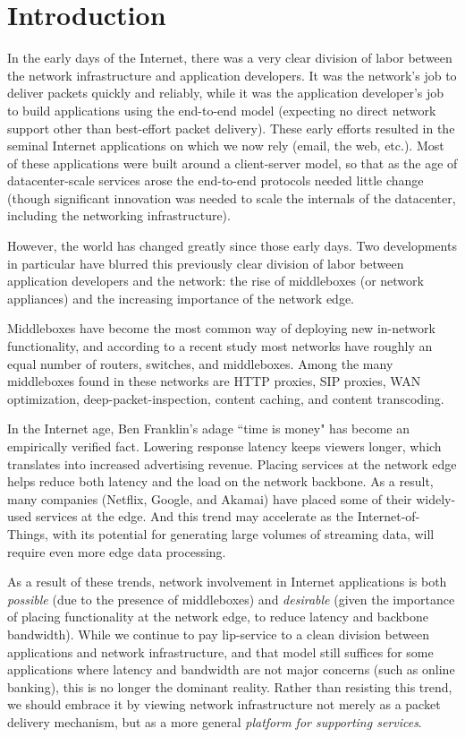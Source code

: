 \section{Introduction}
\label{sec:intro}

In the early days of the Internet, there was a very clear division of labor between the network infrastructure and application developers. It was the network's job to deliver packets quickly and reliably, while it was the application developer's job to build applications using the end-to-end model (\ie expecting no direct network support other than best-effort packet delivery). These early efforts resulted in the seminal Internet applications on which we now rely (email, the web, etc.).  Most of these applications were built around a client-server model, so that as the age of datacenter-scale services arose the end-to-end protocols needed little change (though significant innovation was needed to scale the internals of the datacenter, including the networking infrastructure). 

However, the world has changed greatly since those early days. Two developments in particular have blurred this previously clear division of labor between application developers and the network: the rise of middleboxes (or network appliances) and the increasing importance of the network edge. 

Middleboxes have become the most common way of deploying new in-network functionality, and according to a recent study\cite{sylviamidbox} most networks have roughly an equal number of routers, switches, and middleboxes. Among the many middleboxes found in these networks are HTTP proxies, SIP proxies, WAN optimization, deep-packet-inspection, content caching, and content transcoding. 

In the Internet age, Ben Franklin's adage ``time is money" has become an empirically verified fact. Lowering response latency keeps viewers longer, which translates into increased advertising revenue. Placing services at the network edge helps reduce both latency and the load on the network backbone. As a result, many companies (\eg Netflix, Google, and Akamai) have placed some of their widely-used services at the edge.  And this trend may accelerate as the Internet-of-Things, with its potential for generating large volumes of streaming data, will require even more edge data processing.

As a result of these trends, network involvement in Internet applications is both {\em possible} (due to the presence of middleboxes) and {\em desirable} (given the importance of placing functionality at the network edge, to reduce latency and backbone bandwidth). While we continue to pay lip-service to a clean division between applications and network infrastructure, and that model still suffices for some applications where latency and bandwidth are not major concerns (such as online banking), this is no longer the dominant reality. Rather than resisting this trend, we should embrace it by viewing network infrastructure not merely as a packet delivery mechanism, but as a more general {\em platform for supporting services}. 

